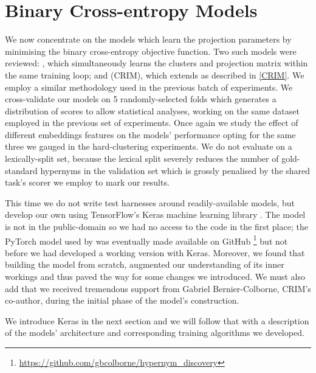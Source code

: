 \section{Binary Cross-entropy Models}
We now concentrate on the models which learn the projection parameters by minimising the binary cross-entropy objective function. Two such models were reviewed: \citep{yamane2016distributional}, which simultaneously learns the clusters and projection matrix within the same training loop; and \citep{bernier2018crim} (CRIM), which extends \citep{yamane2016distributional} as described in \cref{CRIM}.  We employ a similar methodology used in the previous batch of experiments.  We cross-validate our models on 5 randomly-selected folds which generates a distribution of scores to allow statistical analyses, working on the same dataset employed in the previous set of experiments.  Once again we study the effect of different embeddings features on the models' performance opting for the same three we gauged in the hard-clustering experiments.  We do not evaluate on a lexically-split set, because the lexical split severely reduces the number of gold-standard hypernyms in the validation set which is grossly penalised by the shared task's scorer we employ to mark our results.

This time we do not write test harnesses around readily-available models, but develop our own using TensorFlow's Keras machine learning library \citep{chollet2015keras}.  The \citet{yamane2016distributional} model is not in the public-domain so we had no access to the code in the first place; the PyTorch model used by \citet{bernier2018crim} was eventually made available on GitHub \footnote{\url{https://github.com/gbcolborne/hypernym_discovery}} but not before we had developed a working version with Keras.  Moreover, we found that building the model from scratch, augmented our understanding of its inner workings and thus paved the way for some changes we introduced.  We must also add that we received tremendous support from Gabriel Bernier-Colborne, CRIM's co-author, during the initial phase of the model's construction.

We introduce Keras in the next section and we will follow that with a description of the models' architecture and corresponding training algorithms we developed.

